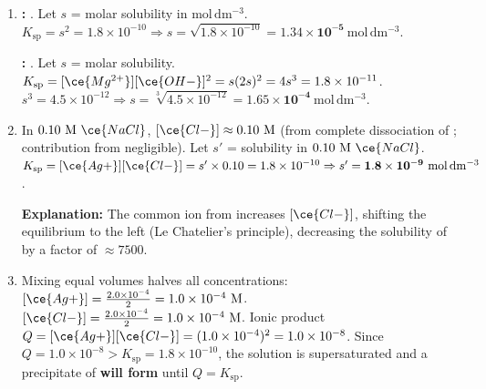 \documentclass[11pt]{article}
\begin{document}
\begin{corrige}
\begin{enumerate}
\item \textbf{:} . Let $s$ = molar solubility in $\mathrm{mol\,dm^{-3}}$.
$K_{\mathrm{sp}} = s^2 = 1.8\times 10^{-10} \Rightarrow s = \sqrt{1.8\times 10^{-10}} = \mathbf{1.34\times 10^{-5}\ \mathrm{mol\,dm^{-3}}}$.
\par \textbf{:} . Let $s$ = molar solubility.
$K_{\mathrm{sp}} = [\ce{Mg^{2+}}][\ce{OH-}]^2 = s(2s)^2 = 4s^3 = 1.8\times 10^{-11}$.
$s^3 = 4.5\times 10^{-12} \Rightarrow s = \sqrt[3]{4.5\times 10^{-12}} = \mathbf{1.65\times 10^{-4}\ \mathrm{mol\,dm^{-3}}}$.
\item In $0.10\ \mathrm{M}\ \ce{NaCl}$, $[\ce{Cl-}] \approx 0.10\ \mathrm{M}$ (from complete dissociation of ; contribution from  negligible).
Let $s'$ = solubility in $0.10\ \mathrm{M}\ \ce{NaCl}$.
$K_{\mathrm{sp}} = [\ce{Ag+}][\ce{Cl-}] = s' \times 0.10 = 1.8\times 10^{-10} \Rightarrow s' = \mathbf{1.8\times 10^{-9}\ \mathrm{mol\,dm^{-3}}}$.
\par \textbf{Explanation:} The common ion  from  increases $[\ce{Cl-}]$, shifting the equilibrium  to the left (Le Chatelier's principle), decreasing the solubility of  by a factor of $\approx 7500$.
\item Mixing equal volumes halves all concentrations:
$[\ce{Ag+}] = \frac{2.0\times 10^{-4}}{2} = 1.0\times 10^{-4}\ \mathrm{M}$.
$[\ce{Cl-}] = \frac{2.0\times 10^{-4}}{2} = 1.0\times 10^{-4}\ \mathrm{M}$.
Ionic product $Q = [\ce{Ag+}][\ce{Cl-}] = (1.0\times 10^{-4})^2 = 1.0\times 10^{-8}$.
Since $Q = 1.0\times 10^{-8} > K_{\mathrm{sp}} = 1.8\times 10^{-10}$, the solution is supersaturated and a precipitate of  \textbf{will form} until $Q = K_{\mathrm{sp}}$.
\end{enumerate}
\end{corrige}
\end{document}
